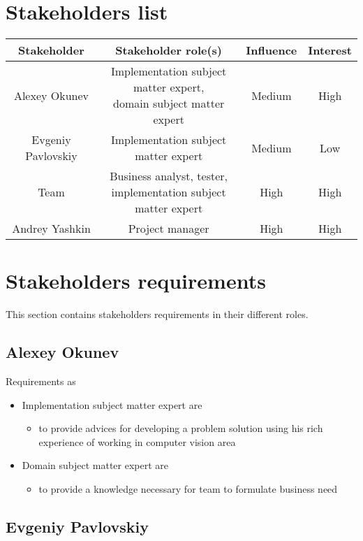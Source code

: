 \section{Stakeholders list}

\begin{tabular}{ | c | c | c | c | }
	\hline
	Stakeholder & Stakeholder role(s) & Influence & Interest \\ \hline
	Alexey Okunev & \specialcell{Implementation subject matter expert, \\ domain subject matter expert} & Medium & High \\ \hline
	Evgeniy Pavlovskiy & Implementation subject matter expert & Medium & Low \\ \hline
	Team &  \specialcell{Business analyst, tester, \\ implementation subject matter expert} & High & High \\ \hline
	Andrey Yashkin & Project manager & High & High \\ \hline
\end{tabular}


\section{Stakeholders requirements}

This section contains stakeholders requirements in their different roles.

\subsection{Alexey Okunev}

Requirements as 
\begin{itemize}
	\item Implementation subject matter expert are
	\begin{itemize}
		\item to provide advices for developing a problem solution using his rich experience of working in computer vision area
	\end{itemize}
	\item Domain subject matter expert are
	\begin{itemize}
		\item to provide a knowledge necessary for team to formulate business need
	\end{itemize}
\end{itemize}

\subsection{Evgeniy Pavlovskiy}

